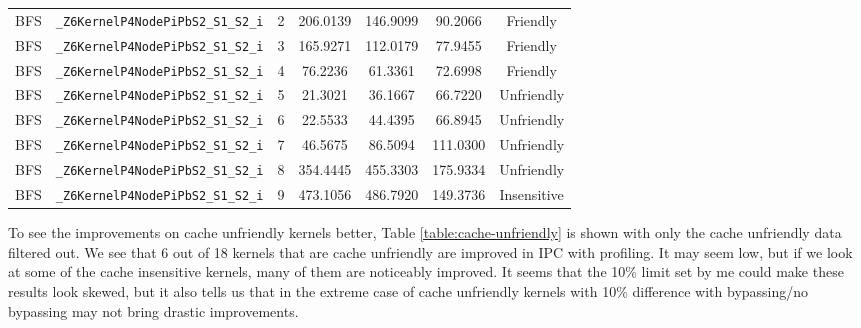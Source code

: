 \documentclass{article}
\begin{document}
\begin{table}[H]
\begin{tabular}{c c c c c c c}
		BFS       & \verb|_Z6KernelP4NodePiPbS2_S1_S2_i| & 2   & 206.0139 & 146.9099      & 90.2066        & Friendly    \\
		BFS       & \verb|_Z6KernelP4NodePiPbS2_S1_S2_i| & 3   & 165.9271 & 112.0179      & 77.9455        & Friendly    \\
		BFS       & \verb|_Z6KernelP4NodePiPbS2_S1_S2_i| & 4   & 76.2236  & 61.3361       & 72.6998        & Friendly    \\
		BFS       & \verb|_Z6KernelP4NodePiPbS2_S1_S2_i| & 5   & 21.3021  & 36.1667       & 66.7220        & Unfriendly  \\
		BFS       & \verb|_Z6KernelP4NodePiPbS2_S1_S2_i| & 6   & 22.5533  & 44.4395       & 66.8945        & Unfriendly  \\
		BFS       & \verb|_Z6KernelP4NodePiPbS2_S1_S2_i| & 7   & 46.5675  & 86.5094       & 111.0300       & Unfriendly  \\
		BFS       & \verb|_Z6KernelP4NodePiPbS2_S1_S2_i| & 8   & 354.4445 & 455.3303      & 175.9334       & Unfriendly  \\
		BFS       & \verb|_Z6KernelP4NodePiPbS2_S1_S2_i| & 9   & 473.1056 & 486.7920      & 149.3736       & Insensitive \\
		[1ex] %
		\hline %
	\end{tabular}
	\label{table:cache-profile} %
\end{table}

To see the improvements on cache unfriendly kernels better, Table \ref{table:cache-unfriendly} is shown with only the cache unfriendly data filtered out. We see that 6 out of 18 kernels that are cache unfriendly are improved in IPC with profiling. It may seem low, but if we look at some of the cache insensitive kernels, many of them are noticeably improved. It seems that the 10\% limit set by me could make these results look skewed, but it also tells us that in the extreme case of cache unfriendly kernels with 10\% difference with bypassing/no bypassing may not bring drastic improvements.
\end{document}
